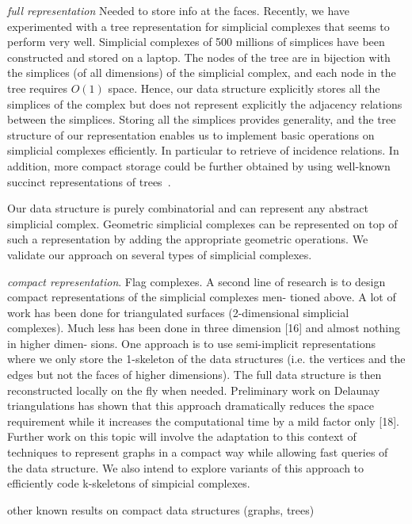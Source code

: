 {\em full representation} Needed to store info at the faces.
Recently, we have experimented with a tree representation for simplicial
complexes that seems to perform very well. Simplicial complexes of 500 millions of simplices have been constructed and stored on a laptop. The nodes of the tree are in bijection with the simplices
(of all dimensions) of the simplicial complex, and each node in the
tree requires $O(1)$ space. Hence, our data structure explicitly stores
all the simplices of the complex but does not represent explicitly the
adjacency relations between the simplices. Storing all the simplices
provides generality, and the tree structure of our representation
enables us to implement basic operations on simplicial complexes
efficiently. In particular to retrieve of incidence relations. In
addition, more compact storage could be further obtained by using
well-known succinct representations of trees~\cite{10.1109/SFCS.1989.63533,Munro:2002:SRB:586840.586885,Ferragina:2005:SLT:1097112.1097456,DBLP:conf/icalp/2003}.

Our data structure is purely combinatorial and can represent any
abstract simplicial complex. Geometric simplicial complexes can be represented
on top of such a representation by adding the appropriate geometric
operations. We validate our approach on several types of simplicial
complexes. 


{\em compact representation}. Flag complexes. 
A second line of research is to design compact representations of the simplicial complexes men- tioned above. A lot of work has been done for triangulated surfaces (2-dimensional simplicial complexes). Much less has been done in three dimension [16] and almost nothing in higher dimen- sions. One approach is to use semi-implicit representations where we only store the 1-skeleton of the data structures (i.e. the vertices and the edges but not the faces of higher dimensions). The full data structure is then reconstructed locally on the fly when needed. Preliminary work on Delaunay triangulations has shown that this approach dramatically reduces the space requirement while it increases the computational time by a mild factor only [18]. Further work on this topic will involve the adaptation to this context of techniques to represent graphs in a compact way while allowing fast queries of the data structure. We also intend to explore variants of this approach to efficiently code k-skeletons of simpicial complexes.

other known results on compact data structures (graphs, trees)

